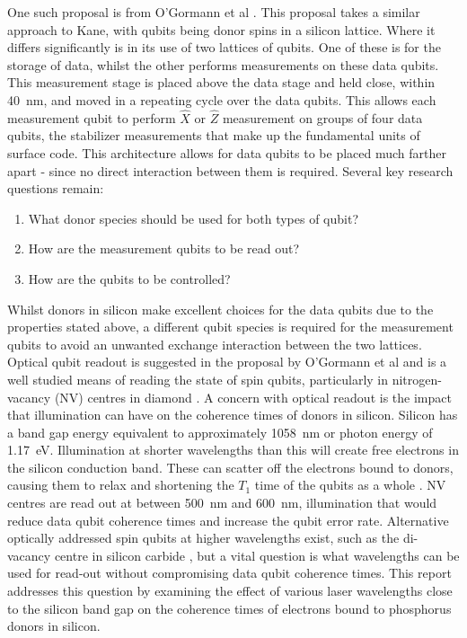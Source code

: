 One such proposal is from O'Gormann et al \cite{OGorman2014}. 
This proposal takes a similar approach to Kane, with qubits being donor spins in a silicon lattice. 
Where it differs significantly is in its use of two lattices of qubits. 
One of these is for the storage of data, whilst the other performs measurements on these data qubits. 
This measurement stage is placed above the data stage and held close, within 40~nm, and moved in a repeating cycle over the data qubits.
This allows each measurement qubit to perform $\hat{X}$ or $\hat{Z}$ measurement on groups of four data qubits, the stabilizer measurements that make up the fundamental units of surface code.
This architecture allows for data qubits to be placed much farther apart - since no direct interaction between them is required.
Several key research questions remain:
\begin{enumerate}
	\item{What donor species should be used for both types of qubit?}
	\item{How are the measurement qubits to be read out?}
	\item{How are the qubits to be controlled?}
\end{enumerate}
Whilst donors in silicon make excellent choices for the data qubits due to the properties stated above, a different qubit species is required for the measurement qubits to avoid an unwanted exchange interaction between the two lattices.
Optical qubit readout is suggested in the proposal by O'Gormann et al and is a well studied means of reading the state of spin qubits, particularly in nitrogen-vacancy (NV) centres in diamond \cite{Liu2017}.
A concern with optical readout is the impact that illumination can have on the coherence times of donors in silicon. 
Silicon has a band gap energy equivalent to approximately 1058~nm or photon energy of 1.17~eV. 
Illumination at shorter wavelengths than this will create free electrons in the silicon conduction band.
These can scatter off the electrons bound to donors, causing them to relax and shortening the $T_1$ time of the qubits as a whole \cite{Ross2017a}.
NV centres are read out at between 500~nm and 600~nm, illumination that would reduce data qubit coherence times and increase the qubit error rate. 
Alternative optically addressed spin qubits at higher wavelengths exist, such as the di-vacancy centre in silicon carbide \cite{Christle2014}, but a vital question is what wavelengths can be used for read-out without compromising data qubit coherence times.
This report addresses this question by examining the effect of various laser wavelengths close to the silicon band gap on the coherence times of electrons bound to phosphorus donors in silicon.
